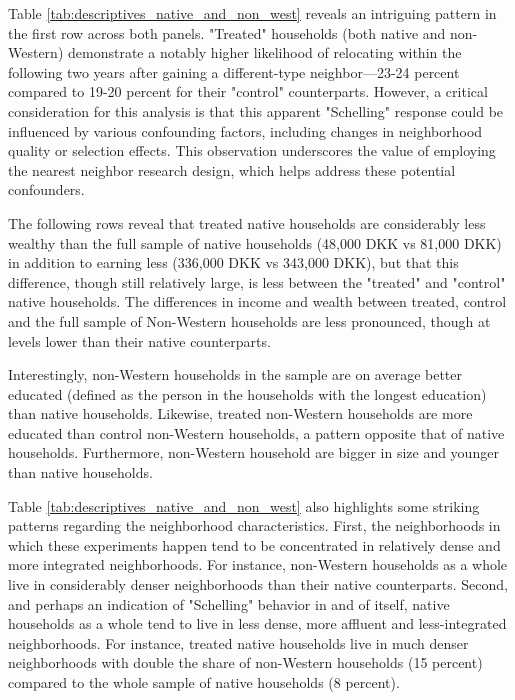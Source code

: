 \documentclass[main.tex]{subfiles}
\begin{document}
Table \ref{tab:descriptives_native_and_non_west} reveals an intriguing pattern in the first row across both panels. "Treated" households (both native and non-Western) demonstrate a notably higher likelihood of relocating within the following two years after gaining a different-type neighbor—23-24 percent compared to 19-20 percent for their "control" counterparts. However, a critical consideration for this analysis is that this apparent "Schelling" response could be influenced by various confounding factors, including changes in neighborhood quality or selection effects. This observation underscores the value of employing the nearest neighbor research design, which helps address these potential confounders.

The following rows reveal that treated native households are considerably less wealthy than the full sample of native households (48,000 DKK vs 81,000 DKK) in addition to earning less (336,000 DKK vs 343,000 DKK), but that this difference, though still relatively large, is less between the "treated" and "control" native households. The differences in income and wealth between treated, control and the full sample of Non-Western households are less pronounced, though at levels lower than their native counterparts.

Interestingly, non-Western households in the sample are on average better educated (defined as the person in the households with the longest education) than native households. Likewise, treated non-Western households are more educated than control non-Western households, a pattern opposite that of native households. Furthermore, non-Western household are bigger in size and younger than native households. 

Table \ref{tab:descriptives_native_and_non_west} also highlights some striking patterns regarding the neighborhood characteristics. First, the neighborhoods in which these experiments happen tend to be concentrated in relatively dense and more integrated neighborhoods. For instance, non-Western households as a whole live in considerably denser neighborhoods than their native counterparts. Second, and perhaps an indication of "Schelling" behavior in and of itself, native households as a whole tend to live in less dense, more affluent and less-integrated neighborhoods. For instance, treated native households live in much denser neighborhoods with double the share of non-Western households (15 percent) compared to the whole sample of native households (8 percent). 
\end{document}
